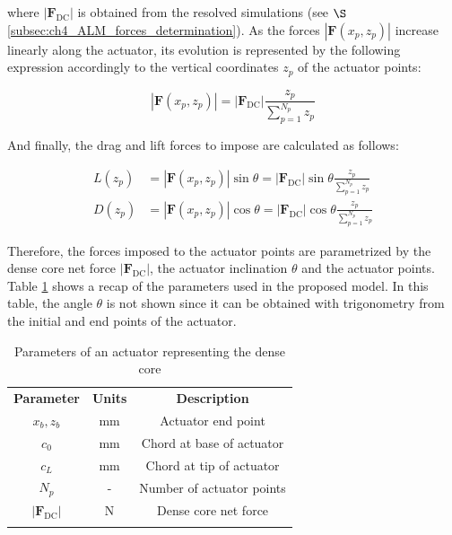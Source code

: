 where $| \textbf{F}_\mathrm{DC} |$ is obtained from the resolved simulations (see $\S$\ref{subsec:ch4_ALM_forces_determination}). As the forces $| \textbf{F} \left( x_p, z_p \right)|$ increase linearly along the actuator, its evolution is represented by the following expression accordingly to the vertical coordinates $z_p$ of the actuator points:

\begin{equation}
|\textbf{F} \left( x_p, z_p \right) | = | \textbf{F}_\mathrm{DC} | \frac{z_p}{\sum_{p=1}^{N_p} z_p}
\end{equation}

And finally, the drag and lift forces to impose are calculated as follows:

\begin{subequations}
\label{eq:ALM_lift_drag_definitions}
\begin{align}
L \left( z_p \right) &= |\textbf{F} \left( x_p, z_p \right) | \sin \theta = | \textbf{F}_\mathrm{DC} | \sin \theta \frac{z_p}{\sum_{p=1}^{N_p} z_p} \\
D \left( z_p \right) &= |\textbf{F} \left( x_p, z_p \right) | \cos \theta = | \textbf{F}_\mathrm{DC} | \cos \theta \frac{z_p}{\sum_{p=1}^{N_p} z_p}
\end{align}
\end{subequations}

Therefore, the forces imposed to the actuator points are parametrized by the dense core net force $| \textbf{F}_\mathrm{DC} |$, the actuator inclination $\theta$ and the actuator points. Table \ref{tab:alm_parameters} shows a recap of the parameters used in the proposed model. In this table, the angle $\theta$ is not shown since it can be obtained with trigonometry from the initial and end points of the actuator. %

\begin{table}[!h]
\centering
\caption{Parameters of an actuator representing the dense core}
\begin{tabular}{ccc}
\thickhline
\textbf{Parameter} & \textbf{Units} & \textbf{Description} \\ 
\thickhline
$x_b, z_b$ & mm & Actuator end point  \\
$c_0$ & mm & Chord at base of actuator \\
$c_L$ & mm & Chord at tip of actuator \\
$N_p$ & - & Number of actuator points \\
$| \textbf{F}_\mathrm{DC} |$ & N & Dense core net force\\
\thickhline 
\end{tabular}
\label{tab:alm_parameters}
\end{table}


